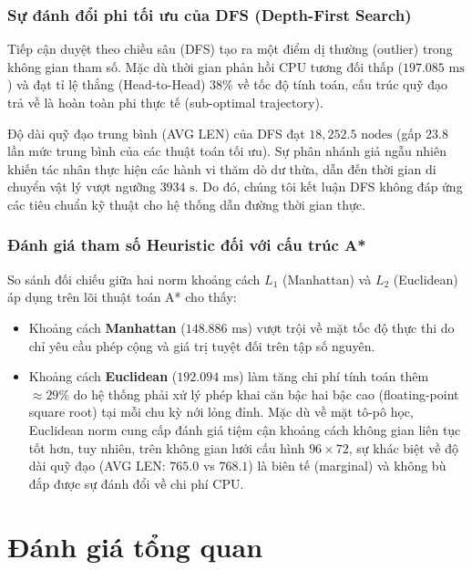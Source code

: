 \documentclass[a4paper, 12pt]{report}
\begin{document}
  \subsubsection{Sự đánh đổi phi tối ưu của DFS (Depth-First Search)}

  Tiếp cận duyệt theo chiều sâu (DFS) tạo ra một điểm dị thường (outlier) trong không gian tham số. Mặc dù thời gian phản hồi CPU tương đối thấp ($197.085\text{ ms}$) và đạt tỉ lệ thắng (Head-to-Head) $38\%$ về tốc độ tính toán, cấu trúc quỹ đạo trả về là hoàn toàn phi thực tế (sub-optimal trajectory).

  Độ dài quỹ đạo trung bình (AVG LEN) của DFS đạt $18,252.5\text{ nodes}$ (gấp $23.8$ lần mức trung bình của các thuật toán tối ưu). Sự phân nhánh giả ngẫu nhiên khiến tác nhân thực hiện các hành vi thăm dò dư thừa, dẫn đến thời gian di chuyển vật lý vượt ngưỡng $3934\text{ s}$. Do đó, chúng tôi kết luận DFS không đáp ứng các tiêu chuẩn kỹ thuật cho hệ thống dẫn đường thời gian thực.

  \subsubsection{Đánh giá tham số Heuristic đối với cấu trúc A*}

  So sánh đối chiếu giữa hai norm khoảng cách $L_1$ (Manhattan) và $L_2$ (Euclidean) áp dụng trên lõi thuật toán A* cho thấy:

  \begin{itemize}
      \item Khoảng cách \textbf{Manhattan} ($148.886\text{ ms}$) vượt trội về mặt tốc độ thực thi do chỉ yêu cầu phép cộng và giá trị tuyệt đối trên tập số nguyên.
      \item Khoảng cách \textbf{Euclidean} ($192.094\text{ ms}$) làm tăng chi phí tính toán thêm $\approx 29\%$ do hệ thống phải xử lý phép khai căn bậc hai bậc cao (floating-point square root) tại mỗi chu kỳ nới lỏng đỉnh. Mặc dù về mặt tô-pô học, Euclidean norm cung cấp đánh giá tiệm cận khoảng cách không gian liên tục tốt hơn, tuy nhiên, trên không gian lưới cấu hình $96 \times 72$, sự khác biệt về độ dài quỹ đạo (AVG LEN: $765.0$ vs $768.1$) là biên tế (marginal) và không bù đắp được sự đánh đổi về chi phí CPU.
  \end{itemize}

  \section{Đánh giá tổng quan}
\end{document}
